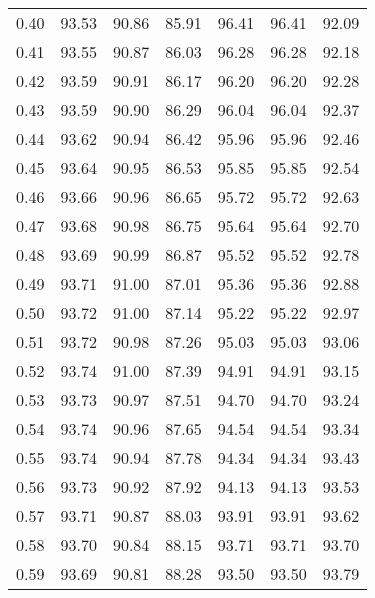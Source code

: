 \begin{tabular}{|c|c|c|c|c|c|c|}
      0.40 &     93.53 &     90.86 &      85.91 &   96.41 &      96.41 &         92.09 \\
      0.41 &     93.55 &     90.87 &      86.03 &   96.28 &      96.28 &         92.18 \\
      0.42 &     93.59 &     90.91 &      86.17 &   96.20 &      96.20 &         92.28 \\
      0.43 &     93.59 &     90.90 &      86.29 &   96.04 &      96.04 &         92.37 \\
      0.44 &     93.62 &     90.94 &      86.42 &   95.96 &      95.96 &         92.46 \\
      0.45 &     93.64 &     90.95 &      86.53 &   95.85 &      95.85 &         92.54 \\
      0.46 &     93.66 &     90.96 &      86.65 &   95.72 &      95.72 &         92.63 \\
      0.47 &     93.68 &     90.98 &      86.75 &   95.64 &      95.64 &         92.70 \\
      0.48 &     93.69 &     90.99 &      86.87 &   95.52 &      95.52 &         92.78 \\
      0.49 &     93.71 &     91.00 &      87.01 &   95.36 &      95.36 &         92.88 \\
      0.50 &     93.72 &     91.00 &      87.14 &   95.22 &      95.22 &         92.97 \\
      0.51 &     93.72 &     90.98 &      87.26 &   95.03 &      95.03 &         93.06 \\
      0.52 &     93.74 &     91.00 &      87.39 &   94.91 &      94.91 &         93.15 \\
      0.53 &     93.73 &     90.97 &      87.51 &   94.70 &      94.70 &         93.24 \\
      0.54 &     93.74 &     90.96 &      87.65 &   94.54 &      94.54 &         93.34 \\
      0.55 &     93.74 &     90.94 &      87.78 &   94.34 &      94.34 &         93.43 \\
      0.56 &     93.73 &     90.92 &      87.92 &   94.13 &      94.13 &         93.53 \\
      0.57 &     93.71 &     90.87 &      88.03 &   93.91 &      93.91 &         93.62 \\
      0.58 &     93.70 &     90.84 &      88.15 &   93.71 &      93.71 &         93.70 \\
      0.59 &     93.69 &     90.81 &      88.28 &   93.50 &      93.50 &         93.79 \\

\end{tabular}
